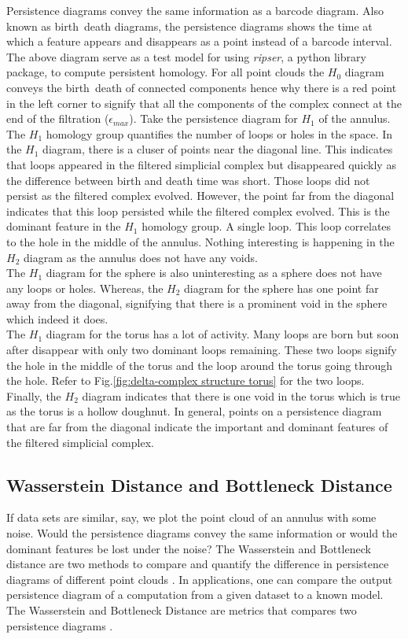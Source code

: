 \documentclass{article}
\begin{document}
Persistence diagrams convey the same information as a barcode diagram. Also known as birth\ death diagrams, the persistence diagrams shows the time at which a feature appears and disappears as a point instead of a barcode interval. The above diagram serve as a test model for using \textit{ripser}, a python library package, to compute persistent homology. For all point clouds the $H_0$ diagram conveys the birth\ death of connected components hence why there is a red point in the left corner to signify that all the components of the complex connect at the end of the filtration ($\epsilon_{max}$). 
Take the persistence diagram for $H_1$  of the annulus. The $H_1$ homology group quantifies the number of loops or holes in the space. In the $H_1$ diagram, there is a cluser of points near the diagonal line. This indicates that loops appeared in the filtered simplicial complex but disappeared quickly as the difference between birth and death time was short. Those loops did not persist as the filtered complex evolved. However, the point far from the diagonal indicates that this loop persisted while the filtered complex evolved. This is the dominant feature in the $H_1$ homology group. A single loop. This loop correlates to the hole in the middle of the annulus. Nothing interesting is happening in the $H_2$ diagram as the annulus does not have any voids.\\
The $H_1$ diagram for the sphere is also uninteresting as a sphere does not have any loops or holes. Whereas, the $H_2$ diagram for the sphere has one point far away from the diagonal, signifying that there is a prominent void in the sphere which indeed it does.\\
The $H_1$ diagram for the torus has a lot of activity. Many loops are born but soon after disappear with only two dominant loops remaining. These two loops signify the hole in the middle of the torus and the loop around the torus going through the hole. Refer to Fig.\ref{fig:delta-complex structure torus} for the two loops. Finally, the $H_2$ diagram indicates that there is one void in the torus which is true as the torus is a hollow doughnut. \break
In general, points on a persistence diagram that are far from the diagonal indicate the important and dominant features of the filtered simplicial complex. 

\subsection{Wasserstein Distance and Bottleneck Distance}
If data sets are similar, say, we plot the point cloud of an annulus with some noise. Would the persistence diagrams convey the same information or would the dominant features be lost under the noise? The Wasserstein and Bottleneck distance are two methods to compare and quantify the difference in persistence diagrams of different point clouds \cite{bubenik2015statistical}\cite{AZComputePH}\cite{CarlssonTDAappli}. In applications, one can compare the output persistence diagram of a computation from a given dataset to a known model. The Wasserstein and Bottleneck Distance are metrics that compares two persistence diagrams \cite{bubenik2015statistical}.\break
\end{document}
